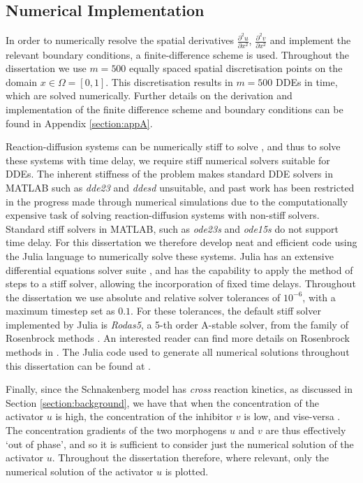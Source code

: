 \subsection{Numerical Implementation}\label{section:numimp}
In order to numerically resolve the spatial derivatives $\frac{\partial^2 u}{\partial x^2}$, $\frac{\partial^2 v}{\partial x^2}$ and implement the relevant boundary conditions, a finite-difference scheme is used. Throughout the dissertation we use $m=500$ equally spaced spatial discretisation points on the domain $x\in\Omega=[0,1]$. This discretisation results in $m=500$ DDEs in time, which are solved numerically. Further details on the derivation and implementation of the finite difference scheme and boundary conditions can be found in Appendix \ref{section:appA}.

Reaction-diffusion systems can be numerically stiff to solve \cite{stiff1, william}, and thus to solve these systems with time delay, we require stiff numerical solvers suitable for DDEs. The inherent stiffness of the problem makes standard DDE solvers in MATLAB such as \emph{dde23} and \emph{ddesd} unsuitable, and past work has been restricted in the progress made through numerical simulations \cite{william} due to the computationally expensive task of solving reaction-diffusion systems with non-stiff solvers. Standard stiff solvers in MATLAB, such as \emph{ode23s} and \emph{ode15s} do not support time delay. For this dissertation we therefore develop neat and efficient code using the Julia language to numerically solve these systems. Julia has an extensive differential equations solver suite \cite{rodas}, and has the capability to apply the method of steps \cite{methsteps} to a stiff solver, allowing the incorporation of fixed time delays. Throughout the dissertation we use absolute and relative solver tolerances of $10^{-6}$, with a maximum timestep set as $0.1$. For these tolerances, the default stiff solver implemented by Julia is \emph{Rodas5}, a 5-th order A-stable solver, from the family of Rosenbrock methods \cite{rodas}. An interested reader can find more details on Rosenbrock methods in \cite{rosenbrock}. The Julia code used to generate all numerical solutions throughout this dissertation can be found at \cite{git}.

Finally, since the Schnakenberg model has \textit{cross} reaction kinetics, as discussed in Section \ref{section:background}, we have that when the concentration of the activator $u$ is high, the concentration of the inhibitor $v$ is low, and vise-versa \cite{murray}. The concentration gradients of the two morphogens $u$ and $v$ are thus effectively `out of phase', and so it is sufficient to consider just the numerical solution of the activator $u$. Throughout the dissertation therefore, where relevant, only the numerical solution of the activator $u$ is plotted.
